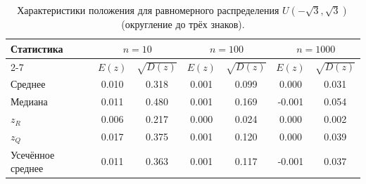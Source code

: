 \begin{table}[H]
\centering
\small
\begin{tabular}{|l|cc|cc|cc|}
\hline
\multirow{2}{*}{Статистика} & \multicolumn{2}{c|}{$n=10$} & \multicolumn{2}{c|}{$n=100$} & \multicolumn{2}{c|}{$n=1000$} \\
\cline{2-7}
 & $E(z)$ & $\sqrt{D(z)}$ & $E(z)$ & $\sqrt{D(z)}$ & $E(z)$ & $\sqrt{D(z)}$ \\
\hline
Среднее & 0.010 & 0.318 & 0.001 & 0.099 & 0.000 & 0.031 \\
\hline
Медиана & 0.011 & 0.480 & 0.001 & 0.169 & -0.001 & 0.054 \\
\hline
$z_R$ & 0.006 & 0.217 & 0.000 & 0.024 & 0.000 & 0.002 \\
\hline
$z_Q$ & 0.017 & 0.375 & 0.001 & 0.120 & 0.000 & 0.039 \\
\hline
Усечённое среднее & 0.011 & 0.363 & 0.001 & 0.117 & -0.001 & 0.037 \\
\hline
\end{tabular}
\caption{Характеристики положения для равномерного распределения $U(-\sqrt{3}, \sqrt{3})$ (округление до трёх знаков).}
\label{tab:uniform_rounded}
\end{table}
